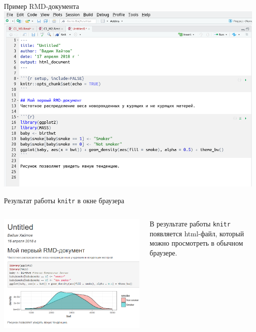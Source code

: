 \documentclass[
  10pt,
  ignorenonframetext,
  aspectratio=169,t,xcolor=table]{beamer}
\newcommand{\columnsbegin}{\vspace{-0.5\baselineskip}\begin{columns}[t,onlytextwidth]}
\newcommand{\columnsend}{\end{columns}}
\begin{document}
\begin{frame}{Пример RMD-документа}
\protect\hypertarget{ux43fux440ux438ux43cux435ux440-rmd-ux434ux43eux43aux443ux43cux435ux43dux442ux430}{}
\includegraphics[height=0.7\textheight,keepaspectratio]{./images/RMD_example_Ira.png}
\end{frame}

\begin{frame}[fragile]{Результат работы \texttt{knitr} в окне браузера}
\protect\hypertarget{ux440ux435ux437ux443ux43bux44cux442ux430ux442-ux440ux430ux431ux43eux442ux44b-knitr-ux432-ux43eux43aux43dux435-ux431ux440ux430ux443ux437ux435ux440ux430}{}
\columnsbegin
{}

\includegraphics[height=0.7\textheight,keepaspectratio]{./images/RMD_browser_view.png}


В результате работы \texttt{knitr} появляется html-файл, который можно
просмотреть в обычном браузере.

\columnsend
\end{frame}
\end{document}
